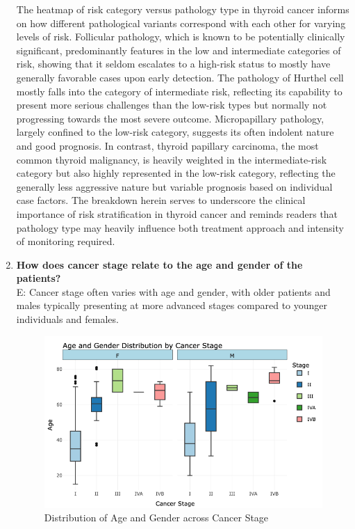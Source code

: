 \documentclass[12pt]{article}
\begin{document}
\begin{enumerate}
    The heatmap of risk category versus pathology type in thyroid cancer informs on how different pathological variants correspond with each other for varying levels of risk. Follicular pathology, which is known to be potentially clinically significant, predominantly features in the low and intermediate categories of risk, showing that it seldom escalates to a high-risk status to mostly have generally favorable cases upon early detection. The pathology of Hurthel cell mostly falls into the category of intermediate risk, reflecting its capability to present more serious challenges than the low-risk types but normally not progressing towards the most severe outcome. Micropapillary pathology, largely confined to the low-risk category, suggests its often indolent nature and good prognosis. In contrast, thyroid papillary carcinoma, the most common thyroid malignancy, is heavily weighted in the intermediate-risk category but also highly represented in the low-risk category, reflecting the generally less aggressive nature but variable prognosis based on individual case factors. The breakdown herein serves to underscore the clinical importance of risk stratification in thyroid cancer and reminds readers that pathology type may heavily influence both treatment approach and intensity of monitoring required.

\newpage

     \item \textbf{How does cancer stage relate to the age and gender of the patients?} \\
    E: Cancer stage often varies with age and gender, with older patients and males typically presenting at more advanced stages compared to younger individuals and females.
    \begin{figure}[h]
        \vspace{5pt}
        \centering
        \includegraphics[width=1.1\textwidth]{age gender vs stage.png}  
        \caption{Distribution of Age and Gender across Cancer Stage}
            \label{fig:example}
       \vspace{0.5cm}
    \end{figure}


\end{enumerate}
\end{document}
